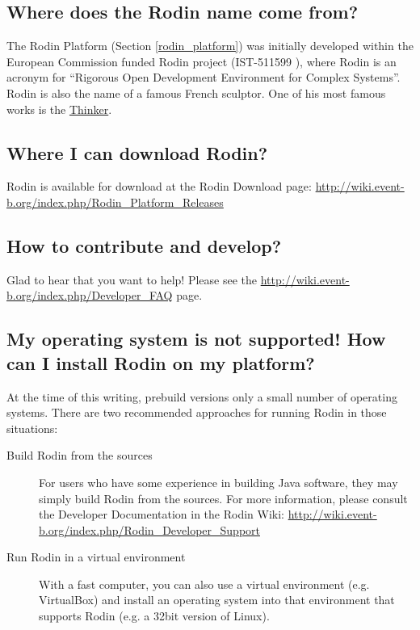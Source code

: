 \subsection{Where does the Rodin name come from?}

The Rodin Platform (Section \ref{rodin_platform}) was initially developed within the European Commission funded Rodin project (IST-511599 ), where Rodin is an acronym for ``Rigorous Open Development Environment for Complex Systems”. Rodin is also the name of a famous French sculptor. One of his most famous works is the \href{http://en.wikipedia.org/wiki/The_Thinker}{Thinker}. 

\subsection{Where I can download Rodin?}
\label{faq_where_download_rodin}

Rodin is available for download at the Rodin Download page: \url{http://wiki.event-b.org/index.php/Rodin_Platform_Releases}

\subsection{How to contribute and develop?}

Glad to hear that you want to help!  Please see the \url{http://wiki.event-b.org/index.php/Developer_FAQ} page.

\subsection{My operating system is not supported!  How can I install Rodin on my platform?}
\label{faq_os_not_supported}
At the time of this writing, prebuild versions only a small number of operating systems.  There are two recommended approaches for running Rodin in those situations:
\begin{description}
	\item[Build Rodin from the sources] For users who have some experience in building Java software, they may simply build Rodin from the sources.  For more information, please consult the Developer Documentation in the Rodin Wiki: \url{http://wiki.event-b.org/index.php/Rodin_Developer_Support}
	\item[Run Rodin in a virtual environment] With a fast computer, you can also use a virtual environment (e.g. VirtualBox) and install an operating system into that environment that supports Rodin (e.g. a 32bit version of Linux).
\end{description}


